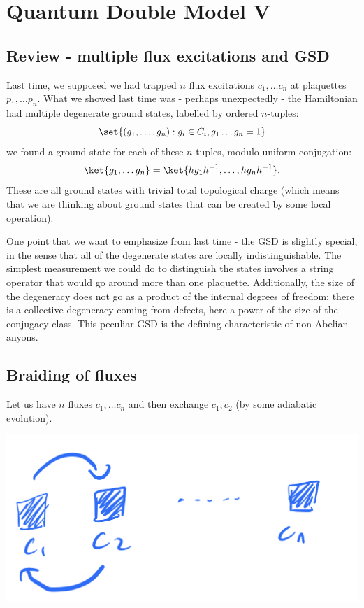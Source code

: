 \section{Quantum Double Model V}
\subsection{Review - multiple flux excitations and GSD}
Last time, we supposed we had trapped $n$ flux excitations $c_1, \ldots c_n$ at plaquettes $p_1, \ldots p_n$. What we showed last time was - perhaps unexpectedly - the Hamiltonian had multiple degenerate ground states, labelled by ordered $n$-tuples:
\begin{equation}
    \set{(g_1, \ldots, g_n): g_i \in C_i, g_1\ldots g_n=1}
\end{equation}
we found a ground state for each of these $n$-tuples, modulo uniform conjugation:
\begin{equation}
    \ket{g_1, \ldots g_n} = \ket{hg_1h^{-1}, \ldots, hg_nh^{-1}}.
\end{equation}
These are all ground states with trivial total topological charge (which means that we are thinking about ground states that can be created by some local operation).

One point that we want to emphasize from last time - the GSD is slightly special, in the sense that all of the degenerate states are locally indistinguishable. The simplest measurement we could do to distinguish the states involves a string operator that would go around more than one plaquette. Additionally, the size of the degeneracy does not go as a product of the internal degrees of freedom; there is a collective degeneracy coming from defects, here a power of the size of the conjugacy class. This peculiar GSD is the defining characteristic of non-Abelian anyons.

\subsection{Braiding of fluxes}
Let us have $n$ fluxes $c_1, \ldots c_n$ and then exchange $c_1, c_2$ (by some adiabatic evolution). 

\begin{center}
    \includegraphics[scale=0.35]{Lectures/Images/lec10-fluxswap.png}
\end{center}

